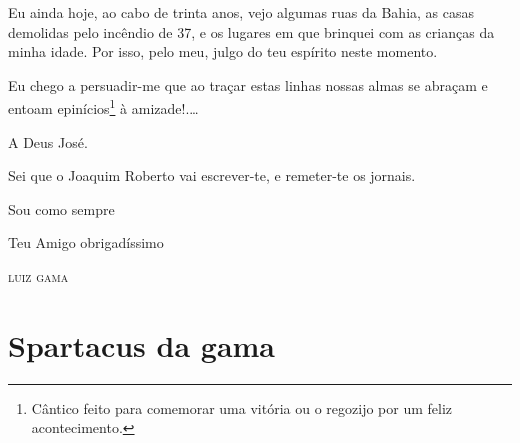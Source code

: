 {Eu ainda hoje, ao cabo de trinta anos, vejo algumas ruas da Bahia, as
casas demolidas pelo incêndio de 37, e os lugares em que brinquei com as
crianças da minha idade. Por isso, pelo meu, julgo do teu espírito neste
momento.

Eu chego a persuadir-me que ao traçar estas linhas nossas almas se
abraçam e entoam epinícios\footnote{ Cântico feito para comemorar uma
  vitória ou o regozijo por um feliz acontecimento.} à amizade!.\ldots{}

A Deus José.

Sei que o Joaquim Roberto vai escrever-te, e remeter-te os jornais.

\begin{flushright}
Sou como sempre

Teu Amigo obrigadíssimo

\textsc{luiz gama}
\end{flushright}

\part{Spartacus da gama}

}
